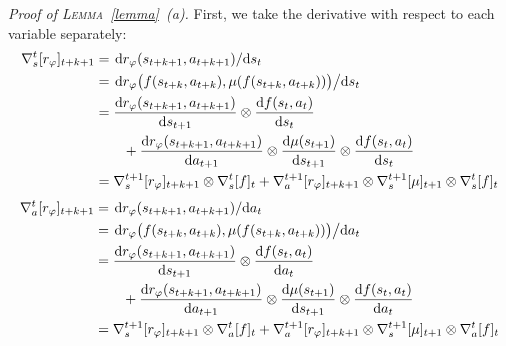 \emph{Proof of \textsc{Lemma}~\ref{lemma}~\emph{(a)}.}
First, we take the derivative with respect to each variable separately:
\begin{align}
\nabla_s^t[r_\varphi]_{t+k+1}
&= \dv*{r_\varphi (s_{t+k+1}, a_{t+k+1})}{s_t} \\
&= \dv*{r_\varphi \big(f(s_{t+k}, a_{t+k}), \mu(f(s_{t+k}, a_{t+k}))\big)}{s_t} \\
&= \dv{r_\varphi (s_{t+k+1}, a_{t+k+1})}{s_{t+1}}
\otimes \dv{f(s_t, a_t)}{s_t} \\
&\qquad + \dv{r_\varphi (s_{t+k+1}, a_{t+k+1})}{a_{t+1}}
\otimes \dv{\mu(s_{t+1})}{s_{t+1}}
\otimes \dv{f(s_t, a_t)}{s_t} \nonumber \\
&= \nabla_s^{t+1}[r_\varphi]_{t+k+1} \otimes \nabla_s^t[f]_t
+ \nabla_a^{t+1}[r_\varphi]_{t+k+1} \otimes \nabla_s^{t+1}[\mu]_{t+1} \otimes \nabla_s^t[f]_t
\end{align}
\begin{align}
\nabla_a^t[r_\varphi]_{t+k+1}
&= \dv*{r_\varphi (s_{t+k+1}, a_{t+k+1})}{a_t} \\
&= \dv*{r_\varphi \big(f(s_{t+k}, a_{t+k}), \mu(f(s_{t+k}, a_{t+k}))\big)}{a_t} \\
&= \dv{r_\varphi (s_{t+k+1}, a_{t+k+1})}{s_{t+1}}
\otimes \dv{f(s_t, a_t)}{a_t} \\
&\qquad + \dv{r_\varphi (s_{t+k+1}, a_{t+k+1})}{a_{t+1}}
\otimes\dv{\mu(s_{t+1})}{s_{t+1}}
\otimes\dv{f(s_t, a_t)}{a_t} \nonumber \\
&= \nabla_s^{t+1}[r_\varphi]_{t+k+1} \otimes \nabla_a^t[f]_t
+ \nabla_a^{t+1}[r_\varphi]_{t+k+1} \otimes \nabla_s^{t+1}[\mu]_{t+1} \otimes \nabla_a^t[f]_t
\end{align}

